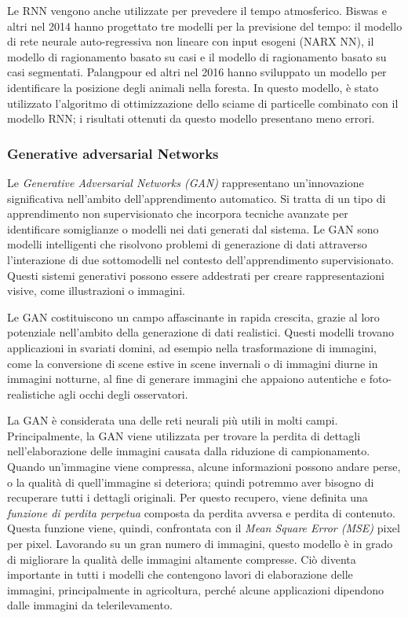 Le RNN vengono anche utilizzate per prevedere il tempo atmosferico. Biswas e altri nel 2014 hanno progettato tre modelli per la previsione del tempo: il modello di rete neurale auto-regressiva non lineare con input esogeni (NARX NN), il modello di ragionamento basato su casi e il modello di ragionamento basato su casi segmentati. Palangpour ed altri nel 2016 hanno sviluppato un modello per identificare la posizione degli animali nella foresta. In questo modello, è stato utilizzato l'algoritmo di ottimizzazione dello sciame di particelle combinato con il modello RNN; i risultati ottenuti da questo modello presentano meno errori.

\subsubsection{Generative adversarial Networks}

Le \textit{Generative Adversarial Networks (GAN)} rappresentano un'innovazione significativa nell'ambito dell'apprendimento automatico. Si tratta di un tipo di apprendimento non supervisionato che incorpora tecniche avanzate per identificare somiglianze o modelli nei dati generati dal sistema. Le GAN sono modelli intelligenti che risolvono problemi di generazione di dati attraverso l'interazione di due sottomodelli nel contesto dell'apprendimento supervisionato. Questi sistemi generativi possono essere addestrati per creare rappresentazioni visive, come illustrazioni o immagini.

Le GAN costituiscono un campo affascinante in rapida crescita, grazie al loro potenziale nell'ambito della generazione di dati realistici. Questi modelli trovano applicazioni in svariati domini, ad esempio nella trasformazione di immagini, come la conversione di scene estive in scene invernali o di immagini diurne in immagini notturne, al fine di generare immagini che appaiono autentiche e foto-realistiche agli occhi degli osservatori.

La GAN è considerata una delle reti neurali più utili in molti campi. Principalmente, la GAN viene utilizzata per trovare la perdita di dettagli nell'elaborazione delle immagini causata dalla riduzione di campionamento. Quando un'immagine viene compressa, alcune informazioni possono andare perse, o la qualità di quell'immagine si deteriora; quindi potremmo aver bisogno di recuperare tutti i dettagli originali. Per questo recupero, viene definita una \textit{funzione di perdita perpetua} composta da perdita avversa e perdita di contenuto. Questa funzione viene, quindi, confrontata con il \textit{Mean Square Error (MSE)} pixel per pixel. Lavorando su un gran numero di immagini, questo modello è in grado di migliorare la qualità delle immagini altamente compresse. Ciò diventa importante in tutti i modelli che contengono lavori di elaborazione delle immagini, principalmente in agricoltura, perché alcune applicazioni dipendono dalle immagini da telerilevamento.

